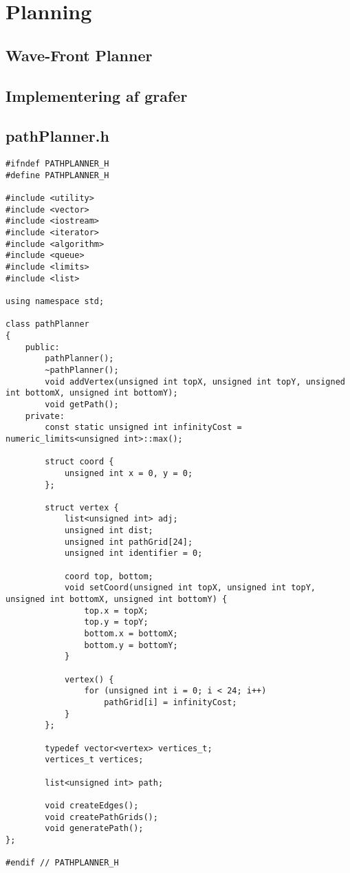 \appendices
\section{Planning}
\subsection{Wave-Front Planner}
\label{app:wave}

\newpage
\subsection{Implementering af grafer}
\label{app:graf}
\subsection{pathPlanner.h}
\begin{lstlisting}
#ifndef PATHPLANNER_H
#define PATHPLANNER_H

#include <utility>
#include <vector>
#include <iostream>
#include <iterator>
#include <algorithm>
#include <queue>
#include <limits>
#include <list>

using namespace std;

class pathPlanner
{
	public:
   		pathPlanner();
    	~pathPlanner();
    	void addVertex(unsigned int topX, unsigned int topY, unsigned int bottomX, unsigned int bottomY);
    	void getPath();
	private:
   		const static unsigned int infinityCost = numeric_limits<unsigned int>::max();

    	struct coord {
        	unsigned int x = 0, y = 0;
    	};

		struct vertex {
        	list<unsigned int> adj;
        	unsigned int dist;
       		unsigned int pathGrid[24];
        	unsigned int identifier = 0;

        	coord top, bottom;
        	void setCoord(unsigned int topX, unsigned int topY, unsigned int bottomX, unsigned int bottomY) {
           		top.x = topX;
            	top.y = topY;
            	bottom.x = bottomX;
    	    	bottom.y = bottomY;
        	}

        	vertex() {
        		for (unsigned int i = 0; i < 24; i++)
		    		pathGrid[i] = infinityCost;
    		}
    	};

    	typedef vector<vertex> vertices_t;
    	vertices_t vertices;

    	list<unsigned int> path;
 
    	void createEdges();
    	void createPathGrids();
		void generatePath();
};

#endif // PATHPLANNER_H

\end{lstlisting}~\\
